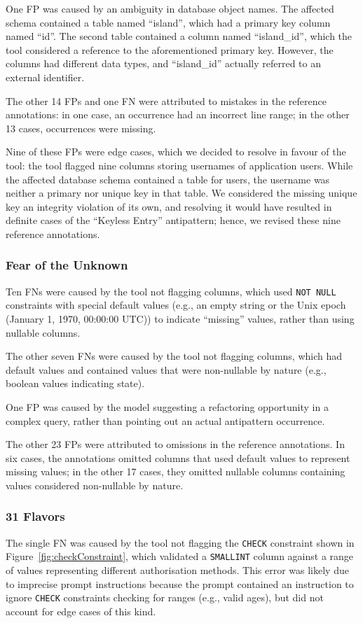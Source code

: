 One FP was caused by an ambiguity in database object names. The affected schema contained a table named “island”, which had a primary key column named “id”. The second table contained a column named “island\_id”, which the tool considered a reference to the aforementioned primary key. However, the columns had different data types, and “island\_id” actually referred to an external identifier.

The other 14 FPs and one FN were attributed to mistakes in the reference annotations: in one case, an occurrence had an incorrect line range; in the other 13 cases, occurrences were missing.

Nine of these FPs were edge cases, which we decided to resolve in favour of the tool: the tool flagged nine columns storing usernames of application users. While the affected database schema contained a table for users, the username was neither a primary nor unique key in that table. We considered the missing unique key an integrity violation of its own, and resolving it would have resulted in definite cases of the “Keyless Entry” antipattern; hence, we revised these nine reference annotations.

\subsubsection*{Fear of the Unknown}
Ten FNs were caused by the tool not flagging columns, which used \texttt{NOT NULL} constraints with special default values (e.g., an empty string or the Unix epoch (January 1, 1970, 00:00:00 UTC)) to indicate “missing” values, rather than using nullable columns.

The other seven FNs were caused by the tool not flagging columns, which had default values and contained values that were non-nullable by nature (e.g., boolean values indicating state).

One FP was caused by the model suggesting a refactoring opportunity in a complex query, rather than pointing out an actual antipattern occurrence.

The other 23 FPs were attributed to omissions in the reference annotations. In six cases, the annotations omitted columns that used default values to represent missing values; in the other \num{17} cases, they omitted nullable columns containing values considered non-nullable by nature.

\subsubsection*{31 Flavors}
The single FN was caused by the tool not flagging the \texttt{CHECK} constraint shown in Figure~\ref{fig:checkConstraint}, which validated a \texttt{SMALLINT} column against a range of values representing different authorisation methods. This error was likely due to imprecise prompt instructions because the prompt contained an instruction to ignore \texttt{CHECK} constraints checking for ranges (e.g., valid ages), but did not account for edge cases of this kind.

